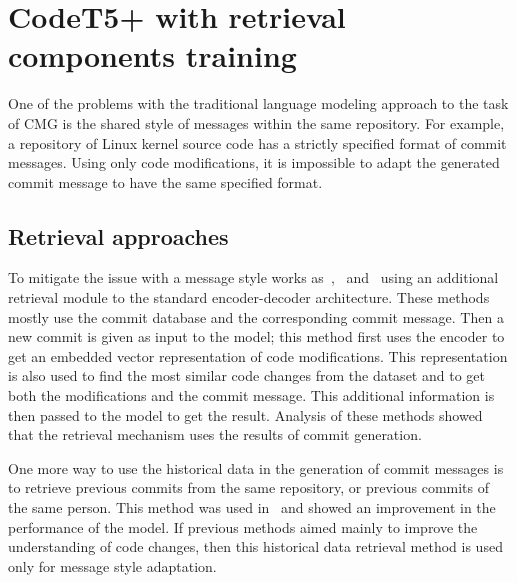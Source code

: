 \section{CodeT5+ with retrieval components training}\label{sec:codeT5_with_retrieval_train}
One of the problems with the traditional language modeling approach to the task of CMG is the shared style of messages within the same repository. For example, a repository of Linux kernel source code has a strictly specified format of commit messages. Using only code modifications, it is impossible to adapt the generated commit message to have the same specified format. 

\subsection{Retrieval approaches}\label{subsec:retrieval_existing_methods}
To mitigate the issue with a message style works as~\cite{shi2022race},~\cite{liu2020atom} and~\cite{wang2021context} using an additional retrieval module to the standard encoder-decoder architecture. These methods mostly use the commit database and the corresponding commit message. Then a new commit is given as input to the model; this method first uses the encoder to get an embedded vector representation of code modifications. This representation is also used to find the most similar code changes from the dataset and to get both the modifications and the commit message. This additional information is then passed to the model to get the result. Analysis of these methods showed that the retrieval mechanism uses the results of commit generation. 

One more way to use the historical data in the generation of commit messages is to retrieve previous commits from the same repository, or previous commits of the same person. This method was used in~\cite{eliseeva2023commit} and showed an improvement in the performance of the model. If previous methods aimed mainly to improve the understanding of code changes, then this historical data retrieval method is used only for message style adaptation.   

